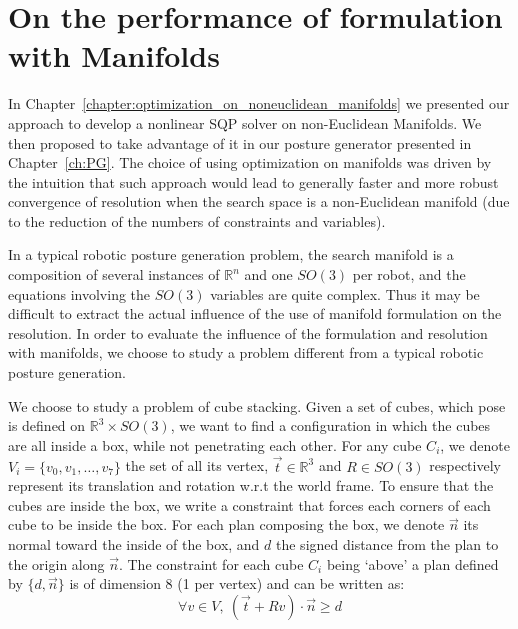 \section{On the performance of formulation with Manifolds}
\label{sec:On_the_performance_of_formulation_with_manifolds}

In Chapter~\ref{chapter:optimization_on_noneuclidean_manifolds} we presented our approach to develop a nonlinear SQP solver on non-Euclidean Manifolds.
We then proposed to take advantage of it in our posture generator presented in Chapter~\ref{ch:PG}.
The choice of using optimization on manifolds was driven by the intuition that such approach would lead to generally faster and more robust convergence of resolution when the search space is a non-Euclidean manifold (due to the reduction of the numbers of constraints and variables).

In a typical robotic posture generation problem, the search manifold is a composition of several instances of $\mathbb{R}^n$ and one $SO(3)$ per robot, and the equations involving the $SO(3)$ variables are quite complex.
Thus it may be difficult to extract the actual influence of the use of manifold formulation on the resolution.
In order to evaluate the influence of the formulation and resolution with manifolds, we choose to study a problem different from a typical robotic posture generation.

We choose to study a problem of cube stacking.
Given a set of cubes, which pose is defined on $\mathbb{R}^3 \times SO(3)$, we want to find a configuration in which the cubes are all inside a box, while not penetrating each other.
For any cube $C_i$, we denote $V_i = \{v_0, v_1, \ldots, v_7\}$  the set of all its vertex, $\vec{t}\in\mathbb{R}^3$ and $R\in SO(3)$ respectively represent its translation and rotation w.r.t the world frame.
To ensure that the cubes are inside the box, we write a constraint that forces each corners of each cube to be inside the box.
For each plan composing the box, we denote $\vec{n}$ its normal toward the inside of the box, and $d$ the signed distance from the plan to the origin along $\vec{n}$.
The constraint for each cube $C_i$ being `above' a plan defined by $\{d, \vec{n}\}$ is of dimension 8 (1 per vertex) and can be written as:
\begin{equation}
  \forall v\in V,\ (\vec{t} + R v)\cdot \vec{n} \geq d
\end{equation}

